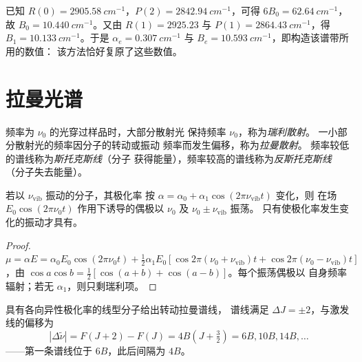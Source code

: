 \begin{example}\label{ex:b3:rovibrational-spectroscopy:analysis}
已知 $R(0) = \qty{2905.58}{cm^{-1}}$，$P(2) = \qty{2842.94}{cm^{-1}}$，可得
$6B_0 = \qty{62.64}{cm^{-1}}$，故 $B_0 = \qty{10.440}{cm^{-1}}$。又由 $R(1) = 2925.23$ 与 $P(1) =
\qty{2864.43}{cm^{-1}}$，得 $B_1 = \qty{10.133}{cm^{-1}}$。于是 $\alpha_e = \qty{0.307}{cm^{-1}}$
与 $B_e = \qty{10.593}{cm^{-1}}$，即构造该谱带所用的数值：
该方法恰好复原了这些数值。
\end{example}

\section{拉曼光谱}

\begin{definition}[拉曼散射与瑞利散射]\label{def:b3:rovibrational-spectroscopy:raman}
频率为 $\nu_0$ 的光穿过样品时，大部分散射光
保持频率 $\nu_0$，称为\emph{瑞利散射}。
一小部分散射光的频率因分子的转动或振动
频率而发生偏移，称为\emph{拉曼散射}。
频率较低的谱线称为\emph{斯托克斯线}（分子
获得能量），频率较高的谱线称为\emph{反斯托克斯线}
（分子失去能量）。
\end{definition}

\begin{proposition}[拉曼效应的经典起源]\label{prop:b3:rovibrational-spectroscopy:raman-classical}
若以 $\nu_{\mathrm{vib}}$ 振动的分子，其极化率
按 $\alpha = \alpha_0 + \alpha_1\cos(2\pi\nu_{\mathrm{vib}}t)$ 变化，则
在场 $E_0\cos(2\pi\nu_0t)$ 作用下诱导的偶极以 $\nu_0$ 及 $\nu_0 \pm \nu_{\mathrm{vib}}$ 振荡。
只有使极化率发生变化的振动才具有。
\end{proposition}

\begin{proof}
$\mu = \alpha E = \alpha_0E_0\cos(2\pi\nu_0t) + \frac12\alpha_1E_0[\cos2\pi(\nu_0 +
\nu_{\mathrm{vib}})t + \cos2\pi(\nu_0 - \nu_{\mathrm{vib}})t]$，由 $\cos a\cos b =
\frac12[\cos(a+b) + \cos(a-b)]$。每个振荡偶极以
自身频率辐射；若无 $\alpha_1$，则只剩瑞利项。
\end{proof}

\begin{proposition}[转动拉曼谱线]\label{prop:b3:rovibrational-spectroscopy:rotational-raman}
具有各向异性极化率的线型分子给出转动拉曼谱线，
谱线满足 $\Delta J = \pm2$，与激发线的偏移为
\[
|\Delta\tilde\nu| = F(J+2) - F(J) = 4B(J + \tfrac32) = 6B, 10B, 14B, \dots
\]
——第一条谱线位于 $6B$，此后间隔为 $4B$。
\end{proposition}

